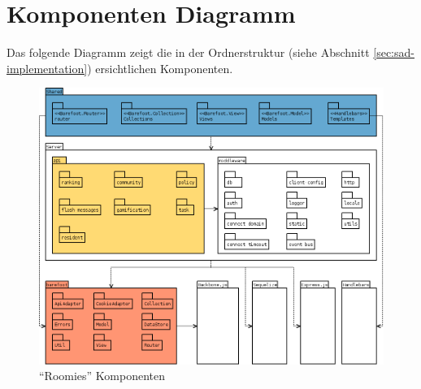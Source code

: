 \section{Komponenten Diagramm}

Das folgende Diagramm zeigt die in der Ordnerstruktur (siehe Abschnitt \ref{sec:sad-implementation}) ersichtlichen Komponenten.

\begin{figure}[ht]
	\includegraphics[width=\textwidth]{content/sad/diagrams/component-diagram.png}
	\caption{``Roomies'' Komponenten}
\end{figure}